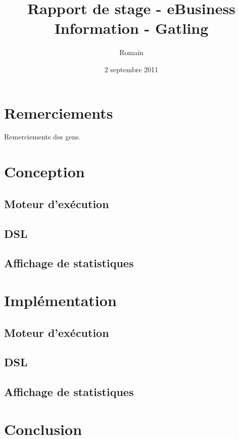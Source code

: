 \documentclass[12pt]{book}
\title{Rapport de stage - eBusiness Information - Gatling}
\author{Romain \bsc{Sertelon}}
\date{2 septembre 2011}
\begin{document}
\maketitle


\frontmatter

\chapter{Remerciements}
Remerciements des gens.
  


\mainmatter





  
\chapter{Conception}
\section{Moteur d'exécution}
\section{DSL}
\section{Affichage de statistiques}
  
\chapter{Implémentation}
\section{Moteur d'exécution}
\section{DSL}
\section{Affichage de statistiques}
  
\chapter{Conclusion}
  
\end{document}
